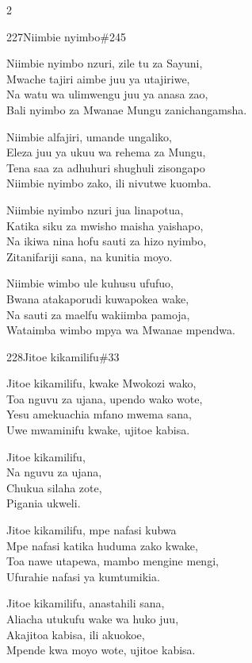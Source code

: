 \documentclass{article}
\begin{document}
\begin{multicols}{2}
\begin{hymn}{227}{Niimbie nyimbo}{\#245}
\begin{stanza}
Niimbie nyimbo nzuri, zile tu za Sayuni,\\
Mwache tajiri aimbe juu ya utajiriwe,\\
Na watu wa ulimwengu juu ya anasa zao,\\
Bali nyimbo za Mwanae Mungu zanichangamsha.
\end{stanza}
\begin{stanza}
Niimbie alfajiri, umande ungaliko,\\
Eleza juu ya ukuu wa rehema za Mungu,\\
Tena saa za adhuhuri shughuli zisongapo\\
Niimbie nyimbo zako, ili nivutwe kuomba.
\end{stanza}
\begin{stanza}
Niimbie nyimbo nzuri jua linapotua,\\
Katika siku za mwisho maisha yaishapo,\\
Na ikiwa nina hofu sauti za hizo nyimbo,\\
Zitanifariji sana, na kunitia moyo.
\end{stanza}
\begin{stanza}
Niimbie wimbo ule kuhusu ufufuo,\\
Bwana atakaporudi kuwapokea wake,\\
Na sauti za maelfu wakiimba pamoja,\\
Wataimba wimbo mpya wa Mwanae mpendwa.
\end{stanza}
\end{hymn}

\begin{hymn}{228}{Jitoe kikamilifu}{\#33}
\begin{stanza}
Jitoe kikamilifu, kwake Mwokozi wako,\\
Toa nguvu za ujana, upendo wako wote,\\
Yesu amekuachia mfano mwema sana,\\
Uwe mwaminifu kwake, ujitoe kabisa.
\end{stanza}
\begin{chorus}
Jitoe kikamilifu,\\
Na nguvu za ujana,\\
Chukua silaha zote,\\
Pigania ukweli.
\end{chorus}
\begin{stanza}
Jitoe kikamilifu, mpe nafasi kubwa\\
Mpe nafasi katika huduma zako kwake,\\
Toa nawe utapewa, mambo mengine mengi,\\
Ufurahie nafasi ya kumtumikia.
\end{stanza}
\begin{stanza}
Jitoe kikamilifu, anastahili sana,\\
Aliacha utukufu wake wa huko juu,\\
Akajitoa kabisa, ili akuokoe,\\
Mpende kwa moyo wote, ujitoe kabisa.
\end{stanza}
\end{hymn}


\end{multicols}
\end{document}
